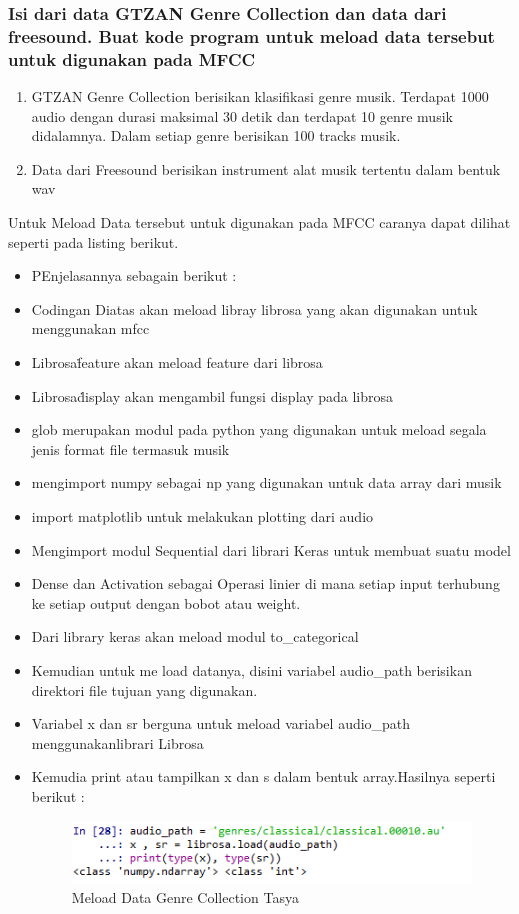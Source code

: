 \subsubsection{Isi dari data GTZAN Genre Collection dan data dari freesound. Buat kode program untuk meload data tersebut untuk digunakan pada MFCC}
\begin{enumerate}
\item GTZAN Genre Collection berisikan klasifikasi genre musik. Terdapat 1000 audio dengan durasi maksimal 30 detik dan terdapat 10 genre musik didalamnya. Dalam setiap genre berisikan 100 tracks musik.
\item Data dari Freesound berisikan instrument alat musik tertentu dalam bentuk wav
\end{enumerate}
Untuk Meload Data tersebut untuk digunakan pada MFCC caranya dapat dilihat seperti pada listing berikut.

\begin{itemize}
\item PEnjelasannya sebagain berikut :\\
\item Codingan Diatas akan meload libray librosa yang akan digunakan untuk menggunakan mfcc
\item Librosa\.feature akan meload feature dari librosa
\item Librosa\.display akan mengambil fungsi display pada librosa
\item glob merupakan modul pada python yang digunakan untuk meload segala jenis format file termasuk musik
\item mengimport numpy sebagai np yang digunakan untuk data array dari musik
\item import matplotlib untuk melakukan plotting dari audio
\item Mengimport modul Sequential dari librari Keras untuk membuat suatu model
\item Dense dan Activation sebagai Operasi linier di mana setiap input terhubung ke setiap output dengan bobot atau weight.
\item Dari library keras akan meload modul to\_categorical
\item Kemudian untuk me load datanya, disini variabel audio\_path berisikan direktori file tujuan yang digunakan.
\item Variabel x dan sr berguna untuk meload variabel audio\_path menggunakanlibrari Librosa
\item Kemudia print atau tampilkan x dan s dalam bentuk array.Hasilnya seperti berikut :
\begin{figure}[ht]
\centering
\includegraphics[scale=0.5]{figures/chapter6tasya23.png}
\caption{Meload Data Genre Collection Tasya}
\label{Praktek}
\end{figure}
\end{itemize}


